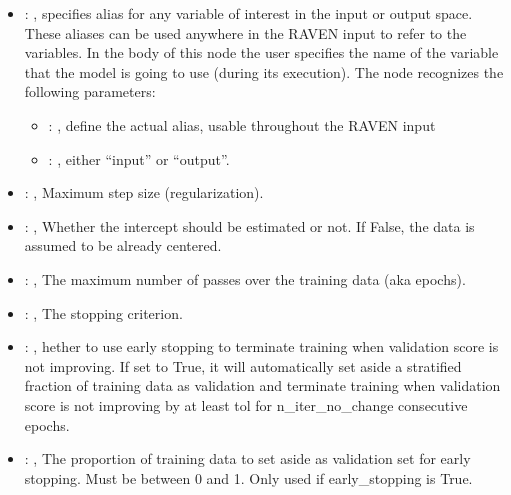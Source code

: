 \begin{itemize}
    \item {}: , 
      specifies alias for         any variable of interest in the input or output space. These
      aliases can be used anywhere in the RAVEN input to         refer to the variables. In the body
      of this node the user specifies the name of the variable that the model is going to use
      (during its execution).
      The  node recognizes the following parameters:
        \begin{itemize}
          \item {}: , 
            define the actual alias, usable throughout the RAVEN input
          \item {}: , 
            either ``input'' or ``output''.
      \end{itemize}

    \item {}: , 
      Maximum step size (regularization).

    \item {}: , 
      Whether the intercept should be estimated or not. If False,
      the data is assumed to be already centered.

    \item {}: , 
      The maximum number of passes over the training data (aka epochs).

    \item {}: , 
      The stopping criterion.

    \item {}: , 
      hether to use early stopping to terminate training when validation score is not
      improving. If set to True, it will automatically set aside a stratified fraction of training
      data as validation and terminate training when validation score is not improving by at least
      tol for n\_iter\_no\_change consecutive epochs.

    \item {}: , 
      The proportion of training data to set aside as validation set for early stopping.
      Must be between 0 and 1. Only used if early\_stopping is True.


\end{itemize}
